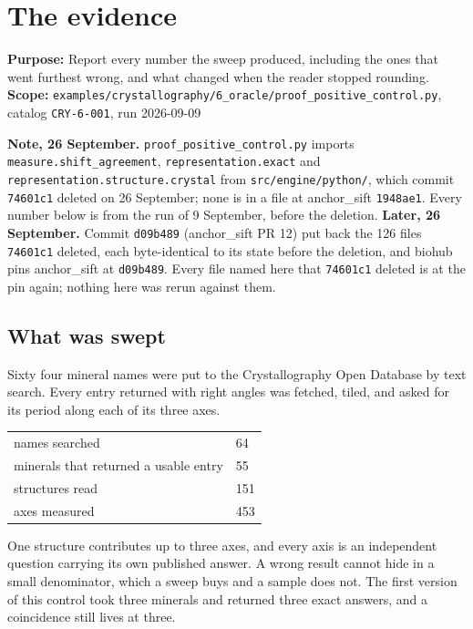 \chapter{The evidence}

\textbf{Purpose:} Report every number the sweep produced, including the ones that went furthest wrong, and what changed when the reader stopped rounding.
\textbf{Scope:} \texttt{examples/\allowbreak{}crystallography/\allowbreak{}6\_\allowbreak{}oracle/\allowbreak{}proof\_\allowbreak{}positive\_\allowbreak{}control.\allowbreak{}py}, catalog \texttt{CRY-6-001}, run 2026-09-09

\textbf{Note, 26 September.} \texttt{proof\_\allowbreak{}positive\_\allowbreak{}control.\allowbreak{}py} imports \texttt{measure.\allowbreak{}shift\_\allowbreak{}agreement}, \texttt{representation.\allowbreak{}exact} and \texttt{representation.\allowbreak{}structure.\allowbreak{}crystal} from \texttt{src/\allowbreak{}engine/\allowbreak{}python/}, which commit \texttt{74601c1} deleted on 26 September; none is in a file at anchor\_sift \texttt{1948ae1}. Every number below is from the run of 9 September, before the deletion. \textbf{Later, 26 September.} Commit \texttt{d09b489} (anchor\_sift PR 12) put back the 126 files \texttt{74601c1} deleted, each byte-identical to its state before the deletion, and biohub pins anchor\_sift at \texttt{d09b489}. Every file named here that \texttt{74601c1} deleted is at the pin again; nothing here was rerun against them.

\section{What was swept}

Sixty four mineral names were put to the Crystallography Open Database by text search. Every entry returned with right angles was fetched, tiled, and asked for its period along each of its three axes.

\begin{longtable}{@{}p{}p{}@{}}
\toprule
\endhead
names searched & 64 \\
minerals that returned a usable entry & 55 \\
structures read & 151 \\
axes measured & 453 \\
\bottomrule
\end{longtable}

One structure contributes up to three axes, and every axis is an independent question carrying its own published answer. A wrong result cannot hide in a small denominator, which a sweep buys and a sample does not. The first version of this control took three minerals and returned three exact answers, and a coincidence still lives at three.

